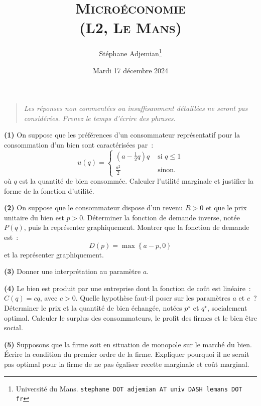 \documentclass[10pt,a4paper,notitlepage,twocolumn]{article}
\newcommand{\question}[1]{\textbf{(#1)}}
\begin{document}
\title{\textsc{Microéconomie\\ \small{(L2, Le Mans)}}}
\author{Stéphane Adjemian\thanks{Université du Mans. \texttt{stephane
DOT adjemian AT univ DASH lemans DOT fr}}}
\date{Mardi 17 décembre 2024}

\maketitle

\thispagestyle{empty}

\bigskip

\begin{quote}
  \textit{Les réponses non commentées ou insuffisamment détaillées ne
  seront pas considérées. Prenez le temps d'écrire des phrases.}
\end{quote}

\bigskip
\bigskip

\question{1} On suppose que les préférences d'un consommateur
représentatif pour la consommation d'un bien sont caractérisées par~:
\[
  u(q) =
  \begin{cases}
    \left( a - \frac{1}{2}q \right)q &\text{ si } q\leq 1\\
    \frac{a^2}{2} &\text{ sinon.}
  \end{cases}
\]
où $q$ est la quantité de bien consommée. Calculer l'utilité
marginale et justifier la forme de la fonction d'utilité.\newline

\question{2} On suppose que le consommateur dispose d'un revenu $R>0$
et que le prix unitaire du bien est $p>0$. Déterminer la fonction de
demande inverse, notée $P(q)$, puis la représenter
graphiquement. Montrer que la fonction de demande est~:
\[
  D(p) = \max\left\{ a-p, 0 \right\}
\]
et la représenter graphiquement.\newline

\question{3} Donner une interprétation au paramètre $a$.\newline

\question{4} Le bien est produit par une entreprise dont la fonction
de coût est linéaire~: $C(q) = c q$, avec $c>0$. Quelle hypothèse
faut-il poser sur les paramètres $a$ et $c$~? Déterminer le prix et la
quantité de bien échangée, notées $p^\star$ et $q^\star$, socialement
optimal. Calculer le surplus des consommateurs, le profit des firmes
et le bien être social.\newline

\question{5} Supposons que la firme soit en situation de monopole sur
le marché du bien. Écrire la condition du premier ordre de la
firme. Expliquer pourquoi il ne serait pas optimal pour la firme de ne
pas égaliser recette marginale et coût marginal.\newline
\end{document}
